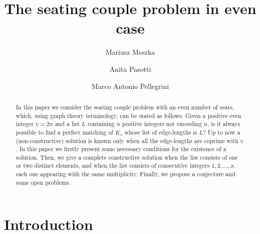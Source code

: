 \documentclass{amsart}
\def\Z{\mathbb{Z}}
\theoremstyle{definition}
\numberwithin{equation}{section}
\begin{document}
\title{The seating couple problem in even case}

\author{Mariusz Meszka}
\address{Faculty of Applied Mathematics,
AGH University of Krak\'ow,
al. Mickiewicza 30,
30-059 Krak\'ow, Poland}

\author{Anita Pasotti}
\address{DICATAM - Sez. Matematica, Universit\`a degli Studi di Brescia,
Via Branze 43, I-25123 Brescia, Italy}

\author{Marco Antonio Pellegrini}
\address{Dipartimento di Matematica e Fisica, Universit\`a Cattolica del Sacro Cuore,
Via della Garzetta 48, I-25133 Brescia, Italy}


\begin{abstract}
In this paper we consider the seating couple problem with an even number of seats, which, using graph theory terminology, can be stated as follows.
Given a positive even integer $v=2n$ and a list $L$ containing $n$ positive integers not exceeding $n$,
is it always possible to find a perfect matching of $K_v$ whose list of edge-lengths is $L$?
Up to now a (non-constructive) solution is known only when all the edge-lengths are coprime with $v$.
In this paper we firstly present some necessary conditions for the existence of a solution.
Then, we give a complete constructive solution when the list consists of one or two distinct elements,
and when the list consists of consecutive integers $1,2,\ldots,x$, each one appearing with the same
multiplicity. Finally, we propose a conjecture and some open problems.
\end{abstract}

 \maketitle

\section{Introduction}
\end{document}
